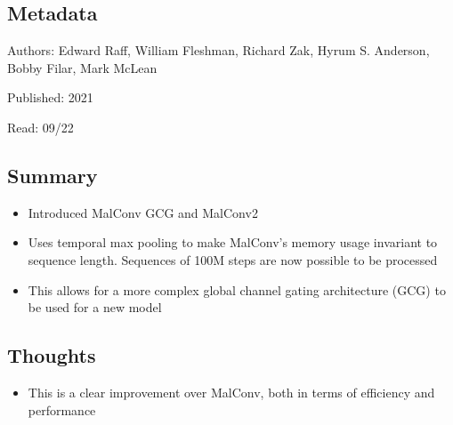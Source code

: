 \documentclass{article}
\begin{document}
\subsection*{Metadata}

\noindent Authors: Edward Raff, William Fleshman, Richard Zak, Hyrum S. Anderson, Bobby Filar, Mark McLean

\noindent Published: 2021

\noindent Read: 09/22

\subsection*{Summary}
\begin{itemize}
	\item Introduced MalConv GCG and MalConv2
	\item Uses temporal max pooling to make MalConv's memory usage invariant to sequence length. Sequences of 100M steps are now possible to be processed
	\item This allows for a more complex global channel gating architecture (GCG) to be used for a new model
\end{itemize}

\subsection*{Thoughts}
\begin{itemize}
	\item This is a clear improvement over MalConv, both in terms of efficiency and performance
\end{itemize}
\end{document}
